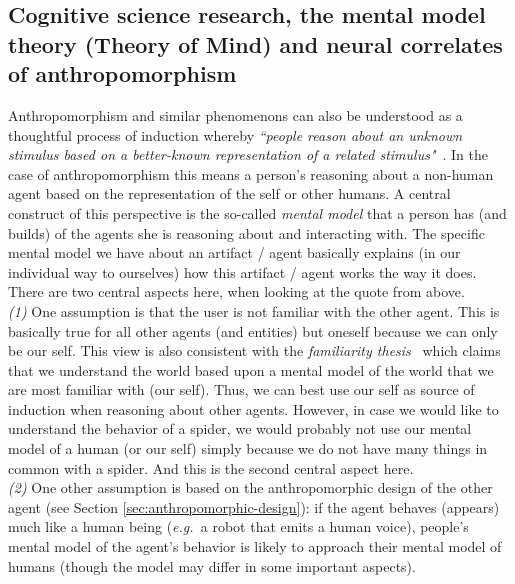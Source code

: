 \documentclass{frontiersSCNS} %
\newcommand{\eg}{{\textit{e.g.~}}}
\begin{document}
\subsection{Cognitive science research, the mental model theory (Theory of Mind)
and neural correlates of anthropomorphism}
\label{sec:cognitive-expl}

Anthropomorphism and similar phenomenons can also be understood as a thoughtful process of induction whereby \textit{``people reason about an unknown stimulus based on a better-known representation of a related stimulus"}~\citep{epley_when_2008}. In the case of anthropomorphism this means a person's reasoning about a non-human agent based on the representation of the self or other humans. A central construct of this perspective is the so-called \textit{mental model} that a person has (and builds) of the agents she is reasoning about and interacting with. The specific mental model we have about an artifact / agent basically explains (in our individual way to ourselves) how this artifact / agent works the way it does.
There are two central aspects here, when looking at the quote from \citep{epley_when_2008} above.\\
\textit{(1)} One assumption is that the user is not familiar with the other agent. This is basically true for all other agents (and entities) but oneself because we can only be our self. This view is also consistent with the \emph{familiarity thesis}~\citep{hegel_understanding_2008} which claims that we understand the world based upon a mental model of the world that we are most familiar with (our self). Thus, we can best use our self as source of induction when reasoning about other agents. However, in case we would like to understand the behavior of a spider, we would probably not use our mental model of a human (or our self) simply because we do not have many things in common with a spider. And this is the second central aspect here.\\
\textit{(2)} One other assumption is based on the anthropomorphic design of the other agent (see Section \ref{sec:anthropomorphic-design}): if the agent behaves (appears) much like a human being (\eg a robot that emits a human voice), people's mental model of the agent's behavior is likely to approach their mental model of humans (though the model may differ in some important aspects).
\end{document}
